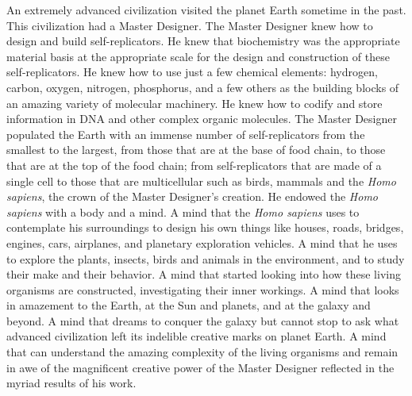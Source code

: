 An extremely advanced civilization visited the planet Earth sometime in
the past. This civilization had a Master Designer.  The Master Designer
knew how to design and build self-replicators. He knew that 
biochemistry was the appropriate material basis at the appropriate
scale for the design and construction of these self-replicators. He
knew how to use just a few chemical elements: hydrogen, carbon, oxygen,
nitrogen, phosphorus, and a few others as the building blocks of an
amazing variety of molecular machinery. He knew how to codify and store
information in DNA and other complex organic molecules. The Master
Designer populated the Earth with an immense number of self-replicators
from the smallest to the largest, from those that are at the base of
food chain, to those that are at the top of the food chain; from
self-replicators that are made of a single cell to those that 
are multicellular such as birds, mammals and
the \textit{Homo sapiens}, the crown of the Master Designer's creation.  He
endowed the \textit{Homo sapiens} with a body and a mind. A mind that the 
\textit{Homo sapiens}
uses to contemplate his surroundings to design his own things
like houses, roads, bridges, engines, cars, airplanes, and planetary
exploration vehicles. A mind that he uses to explore the plants,
insects, birds and animals in the environment, and to study their make and
their behavior.  A mind that started looking into how these living organisms are
constructed, investigating their inner workings. A mind that
looks in amazement to the Earth, at the Sun and planets, and at the galaxy
and beyond. A mind that dreams to conquer the galaxy but cannot
stop to ask what advanced civilization left its indelible creative
marks on planet Earth. A mind that can understand the amazing
complexity of the living organisms and remain in awe of the
magnificent creative power of the Master Designer reflected in the
myriad results of his work.
